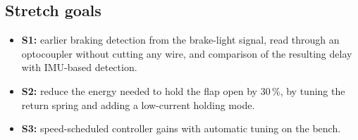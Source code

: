 \documentclass[11pt,a4paper]{article}
\begin{document}
\subsection{Stretch goals}
\begin{itemize}
  \item \textbf{S1:} earlier braking detection from the brake-light signal, read through an optocoupler without cutting any wire, and comparison of the resulting delay with IMU-based detection.
  \item \textbf{S2:} reduce the energy needed to hold the flap open by 30\,\%, by tuning the return spring and adding a low-current holding mode.
  \item \textbf{S3:} speed-scheduled controller gains with automatic tuning on the bench.
\end{itemize}



\end{document}
